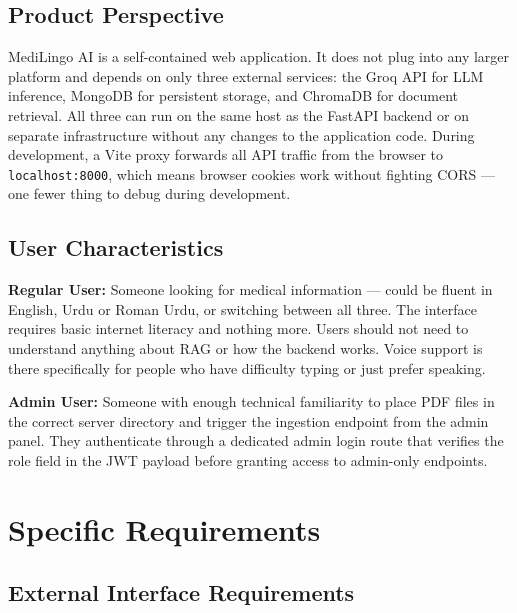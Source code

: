 \subsection{Product Perspective}

MediLingo AI is a self-contained web application. It does not plug into any larger platform
and depends on only three external services: the Groq API for LLM inference, MongoDB for
persistent storage, and ChromaDB for document retrieval. All three can run on the same host
as the FastAPI backend or on separate infrastructure without any changes to the application
code. During development, a Vite proxy forwards all API traffic from the browser to
\texttt{localhost:8000}, which means browser cookies work without fighting CORS --- one
fewer thing to debug during development.

\subsection{User Characteristics}

\textbf{Regular User:}
Someone looking for medical information --- could be fluent in English, Urdu or Roman Urdu,
or switching between all three. The interface requires basic internet literacy and nothing
more. Users should not need to understand anything about RAG or how the backend works. Voice
support is there specifically for people who have difficulty typing or just prefer speaking.

\textbf{Admin User:}
Someone with enough technical familiarity to place PDF files in the correct server directory
and trigger the ingestion endpoint from the admin panel. They authenticate through a
dedicated admin login route that verifies the role field in the JWT payload before granting
access to admin-only endpoints.

\section{Specific Requirements}

\subsection{External Interface Requirements}

